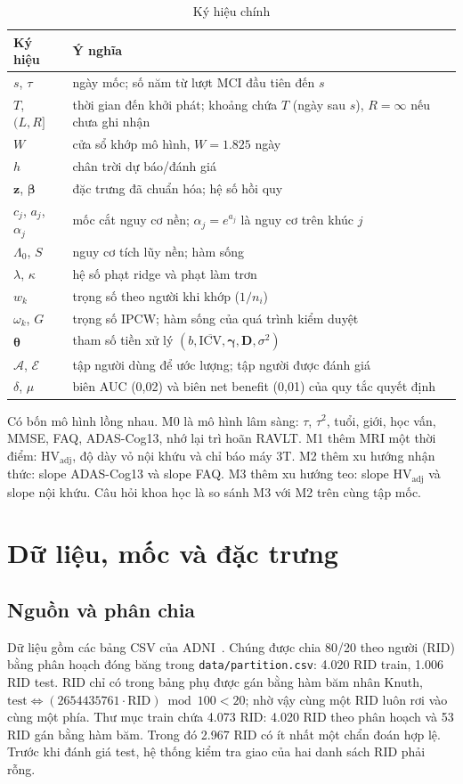 \documentclass[journal]{IEEEtran}
\newcommand{\code}[1]{\texttt{#1}}
\newcommand{\HVadj}{\mathrm{HV}_{\text{adj}}}
\begin{document}
\begin{table}[t]
\caption{Ký hiệu chính}\label{tab:notation}
\centering\footnotesize
\begin{tabular}{@{}lL{0.68\columnwidth}@{}}
\toprule
Ký hiệu & Ý nghĩa\\
\midrule
$s$, $\tau$ & ngày mốc; số năm từ lượt MCI đầu tiên đến $s$\\
$T$, $(L,R]$ & thời gian đến khởi phát; khoảng chứa $T$ (ngày sau $s$), $R=\infty$ nếu chưa ghi nhận\\
$W$ & cửa sổ khớp mô hình, $W=1.825$ ngày\\
$h$ & chân trời dự báo/đánh giá\\
$\bm z$, $\bm\beta$ & đặc trưng đã chuẩn hóa; hệ số hồi quy\\
$c_j$, $a_j$, $\alpha_j$ & mốc cắt nguy cơ nền; $\alpha_j=e^{a_j}$ là nguy cơ trên khúc $j$\\
$\Lambda_0$, $S$ & nguy cơ tích lũy nền; hàm sống\\
$\lambda$, $\kappa$ & hệ số phạt ridge và phạt làm trơn\\
$w_k$ & trọng số theo người khi khớp ($1/n_i$)\\
$\omega_k$, $G$ & trọng số IPCW; hàm sống của quá trình kiểm duyệt\\
$\bm\theta$ & tham số tiền xử lý $(b, \overline{\mathrm{ICV}}, \bm\gamma, \bm D, \sigma^2)$\\
$\mathcal{A}$, $\mathcal{E}$ & tập người dùng để ước lượng; tập người được đánh giá\\
$\delta$, $\mu$ & biên AUC (0,02) và biên net benefit (0,01) của quy tắc quyết định\\
\bottomrule
\end{tabular}
\end{table}

Có bốn mô hình lồng nhau. M0 là mô hình lâm sàng: $\tau$, $\tau^2$, tuổi, giới, học vấn, MMSE, FAQ, ADAS-Cog13, nhớ lại trì hoãn RAVLT. M1 thêm MRI một thời điểm: $\HVadj$, độ dày vỏ nội khứu và chỉ báo máy 3T. M2 thêm xu hướng nhận thức: slope ADAS-Cog13 và slope FAQ. M3 thêm xu hướng teo: slope $\HVadj$ và slope nội khứu. Câu hỏi khoa học là so sánh M3 với M2 trên cùng tập mốc.

\section{Dữ liệu, mốc và đặc trưng}\label{sec:data}
\subsection{Nguồn và phân chia}
Dữ liệu gồm các bảng CSV của ADNI~\cite{adni,petersen2010}. Chúng được chia 80/20 theo người (RID) bằng phân hoạch đóng băng trong \code{data/partition.csv}: 4.020 RID train, 1.006 RID test. RID chỉ có trong bảng phụ được gán bằng hàm băm nhân Knuth, $\text{test} \iff (2654435761\cdot \mathrm{RID}) \bmod 100 < 20$; nhờ vậy cùng một RID luôn rơi vào cùng một phía. Thư mục train chứa 4.073 RID: 4.020 RID theo phân hoạch và 53 RID gán bằng hàm băm. Trong đó 2.967 RID có ít nhất một chẩn đoán hợp lệ. Trước khi đánh giá test, hệ thống kiểm tra giao của hai danh sách RID phải rỗng.
\end{document}
